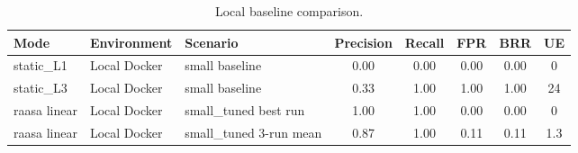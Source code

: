 \begin{table}[t]
\centering
\footnotesize
\setlength{\tabcolsep}{4.0pt}
\renewcommand{\arraystretch}{1.06}
\caption{Local baseline comparison.}
\label{tab:local-baseline-comparison}
\begin{tabular}{l l l c c c c c}
\toprule
Mode & Environment & Scenario & Precision & Recall & FPR & BRR & UE \\
\midrule
static\_L1 & Local Docker & small baseline & 0.00 & 0.00 & 0.00 & 0.00 & 0 \\
static\_L3 & Local Docker & small baseline & 0.33 & 1.00 & 1.00 & 1.00 & 24 \\
raasa linear & Local Docker & small\_tuned best run & 1.00 & 1.00 & 0.00 & 0.00 & 0 \\
raasa linear & Local Docker & small\_tuned 3-run mean & 0.87 & 1.00 & 0.11 & 0.11 & 1.3 \\
\bottomrule
\end{tabular}
\end{table}

